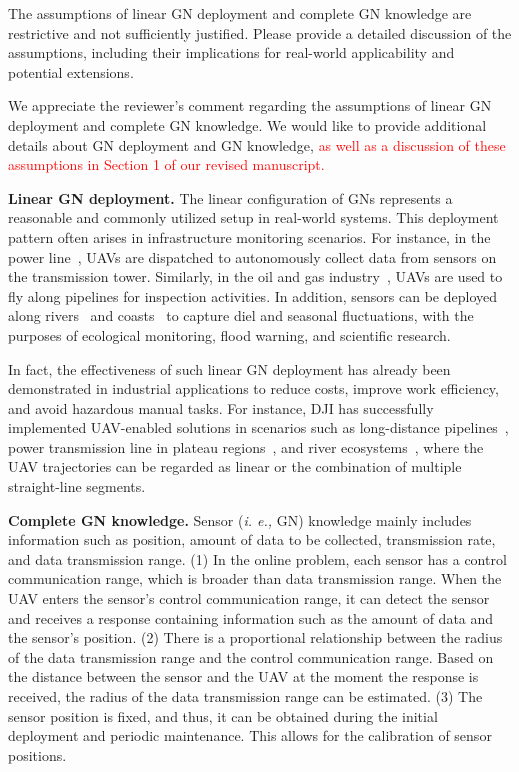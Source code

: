 \begin{revcomment}
	The assumptions of linear GN deployment and complete GN knowledge are restrictive and not sufficiently justified. Please provide a detailed discussion of the assumptions, including their implications for real-world applicability and potential extensions.
\end{revcomment}
\begin{revresponse}
	We appreciate the reviewer's comment regarding the assumptions of linear GN deployment and complete GN knowledge.
	We would like to provide additional details about GN deployment and GN knowledge, 
	\textcolor{red}{as well as a discussion of these assumptions in Section 1 of our revised manuscript.}

	\textbf{Linear GN deployment.}
	The linear configuration of GNs represents a reasonable and commonly utilized setup in real-world systems.
	This deployment pattern often arises in infrastructure monitoring scenarios.
	For instance, in the power line~\cite{powerline,transmission-line}, UAVs are dispatched to autonomously collect data from sensors on the transmission tower.
	Similarly, in the oil and gas industry~\cite{pipeline}, UAVs are used to fly along pipelines for inspection activities.
	In addition, sensors can be deployed along rivers~\cite{river} and coasts~\cite{coast} to capture diel and seasonal fluctuations, with the purposes of ecological monitoring, flood warning, and scientific research.

	In fact, the effectiveness of such linear GN deployment has already been demonstrated in industrial applications to reduce costs, improve work efficiency, and avoid hazardous manual tasks.
	For instance, DJI has successfully implemented UAV-enabled solutions in scenarios such as long-distance pipelines~\cite{DJI-pipeline}, power transmission line in plateau regions~\cite{DJI-powerline}, and river ecosystems~\cite{DJI-river}, where the UAV trajectories can be regarded as linear or the combination of multiple straight-line segments.

	\textbf{Complete GN knowledge.}
	Sensor (\emph{i. e.,} GN) knowledge mainly includes information such as position, amount of data to be collected, transmission rate, and data transmission range.
	(1) In the online problem, each sensor has a control communication range, which is broader than data transmission range.%
	When the UAV enters the sensor's control communication range, it can detect the sensor and receives a response containing information such as the amount of data and the sensor's position.
	(2) There is a proportional relationship between the radius of the data transmission range and the control communication range. %
	Based on the distance between the sensor and the UAV at the moment the response is received, the radius of the data transmission range can be estimated.
	(3) The sensor position is fixed, and thus, it can be obtained during the initial deployment and periodic maintenance. This allows for the calibration of sensor positions.
\end{revresponse}

